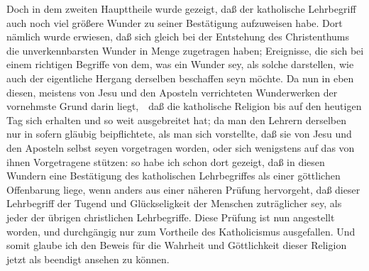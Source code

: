 \begin{aufza}
\item Doch in dem zweiten Haupttheile wurde gezeigt, daß der katholische Lehrbegriff auch noch viel größere Wunder zu seiner Bestätigung aufzuweisen habe. Dort nämlich wurde erwiesen, daß sich gleich bei der Entstehung des Christenthums die unverkennbarsten Wunder in Menge zugetragen haben; Ereignisse, die sich bei einem richtigen Begriffe von dem, was ein Wunder sey, als solche darstellen, wie auch der eigentliche Hergang derselben beschaffen seyn möchte. Da nun in eben diesen, meistens von Jesu und den Aposteln verrichteten Wunderwerken der vornehmste Grund darin liegt,~\ daß die katholische Religion bis auf den heutigen Tag sich erhalten und so weit ausgebreitet hat; da man den Lehrern derselben nur in sofern gläubig beipflichtete, als man sich vorstellte, daß sie von Jesu und den Aposteln selbst seyen vorgetragen worden, oder sich wenigstens auf das von ihnen Vorgetragene stützen: so habe ich schon dort gezeigt, daß in diesen Wundern eine Bestätigung des katholischen Lehrbegriffes als einer göttlichen Offenbarung liege, wenn anders aus einer näheren Prüfung hervorgeht, daß dieser Lehrbegriff der Tugend und Glückseligkeit der Menschen zuträglicher sey, als jeder der übrigen christlichen Lehrbegriffe. Diese Prüfung ist nun angestellt worden, und durchgängig nur zum Vortheile des Katholicismus ausgefallen. Und somit glaube ich den Beweis für die Wahrheit und Göttlichkeit dieser Religion jetzt als beendigt ansehen zu können.

\end{aufza}
